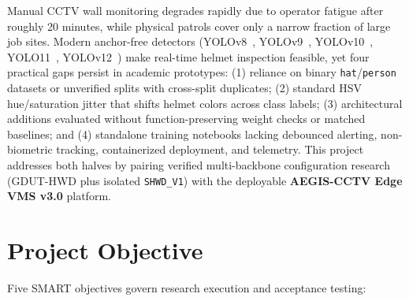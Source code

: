 Manual CCTV wall monitoring degrades rapidly due to operator fatigue after roughly 20 minutes, while physical patrols cover only a narrow fraction of large job sites. Modern anchor-free detectors (YOLOv8~\cite{jocher2023yolov8}, YOLOv9~\cite{wang2024yolov9}, YOLOv10~\cite{wang2024yolov10}, YOLO11~\cite{ultralytics2024yolo11}, YOLOv12~\cite{tian2025yolov12}) make real-time helmet inspection feasible, yet four practical gaps persist in academic prototypes: (1) reliance on binary \texttt{hat}/\texttt{person} datasets or unverified splits with cross-split duplicates; (2) standard HSV hue/saturation jitter that shifts helmet colors across class labels; (3) architectural additions evaluated without function-preserving weight checks or matched baselines; and (4) standalone training notebooks lacking debounced alerting, non-biometric tracking, containerized deployment, and telemetry. This project addresses both halves by pairing verified multi-backbone configuration research (GDUT-HWD plus isolated \texttt{SHWD\_V1}) with the deployable \textbf{AEGIS-CCTV Edge VMS v3.0} platform.

\section{Project Objective}

Five SMART objectives govern research execution and acceptance testing:

